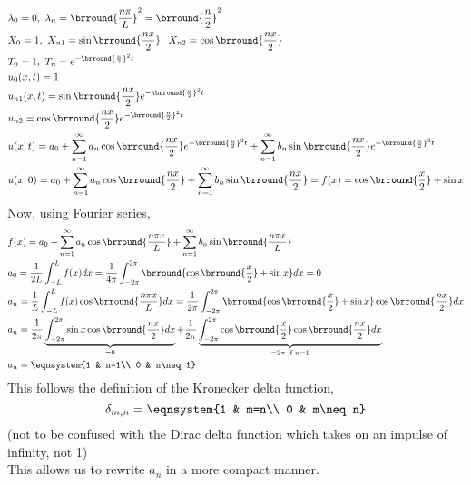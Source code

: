 \begin{align*}
    &\lambda_0=0,\ \lambda_n=\brround{\frac{n\pi}{L}}^2=\brround{\frac{n}{2}}^2\\
    &X_0=1,\ X_{n1}=\sin\brround{\frac{nx}{2}},\ X_{n2}=\cos\brround{\frac{nx}{2}}\\
    &T_0=1,\ T_n=e^{-\brround{\frac{n}{2}}^2t}\\
    &u_0(x,t)=1\\
    &u_{n1}(x,t)=\sin\brround{\frac{nx}{2}}e^{-\brround{\frac{n}{2}}^2t}\\
    &u_{n2}=\cos\brround{\frac{nx}{2}}e^{-\brround{\frac{n}{2}}^2t}\\
    &u(x,t)=a_0+\sum_{n=1}^\infty a_n\cos\brround{\frac{nx}{2}}e^{-\brround{\frac{n}{2}}^2t}+\sum_{n=1}^\infty b_n\sin\brround{\frac{nx}{2}}e^{-\brround{\frac{n}{2}}^2t}\\
    &u(x,0)=a_0+\sum_{n=1}^\infty a_n\cos\brround{\frac{nx}{2}}+\sum_{n=1}^\infty b_n\sin\brround{\frac{nx}{2}}=f(x)=\cos\brround{\frac{x}{2}}+\sin x
\end{align*}
Now, using Fourier series,
\begin{align*}
    &f(x)=a_0+\sum_{n=1}^\infty a_n\cos\brround{\frac{n\pi x}{L}}+\sum_{n=1}^\infty b_n\sin\brround{\frac{n\pi x}{L}}\\
    &a_0=\frac{1}{2L}\int_{-L}^L f(x)dx=\frac{1}{4\pi}\int_{-2\pi}^{2\pi}\brround{\cos\brround{\frac{x}{2}}+\sin x}dx=0\\
    &a_n=\frac{1}{L}\int_{-L}^L f(x)\cos\brround{\frac{n\pi x}{L}}dx=\frac{1}{2\pi}\int_{-2\pi}^{2\pi}\brround{\cos\brround{\frac{x}{2}}+\sin x}\cos\brround{\frac{nx}{2}}dx\\
    &a_n=\frac{1}{2\pi}\underbrace{\int_{-2\pi}^{2\pi}\sin x\cos\brround{\frac{nx}{2}}dx}_{=0}+\frac{1}{2\pi}\underbrace{\int_{-2\pi}^{2\pi}\cos\brround{\frac{x}{2}}\cos\brround{\frac{nx}{2}}dx}_{=2\pi\text{ if }n=1}\\
    &a_n=\eqnsystem{1 & n=1\\ 0 & n\neq 1}
\end{align*}
This follows the definition of the Kronecker delta function,
$$\delta_{m,n}=\eqnsystem{1 & m=n\\ 0 & m\neq n}$$
(not to be confused with the Dirac delta function which takes on an impulse of infinity, not 1)\\
This allows us to rewrite $a_n$ in a more compact manner.
